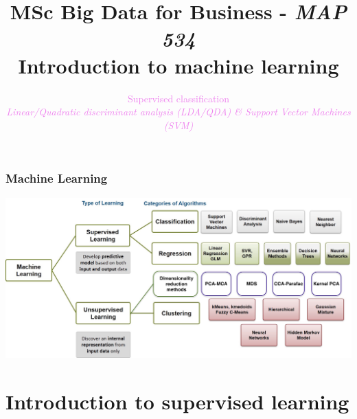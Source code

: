 \documentclass[9pt]{beamer}
\title[Introduction to machine learning]{MSc Big Data for Business - {\em MAP 534} \\
Introduction to machine learning\\}
\author{}
\date{}
\begin{document}
\author[S. Le Corff]{\textcolor{violet}{Supervised classification}\\ {\em {\small \textcolor{violet}{Linear/Quadratic discriminant analysis (LDA/QDA) \& Support Vector Machines (SVM)}}}}


\begin{frame}
  \maketitle 
\end{frame}


\begin{frame}[allowframebreaks]
\frametitle{Machine Learning}
\begin{center}
	\includegraphics[width=\textwidth]{Learning+Types.jpg}
\end{center}
\end{frame}


\section{Introduction to supervised learning}
\end{document}
